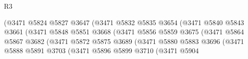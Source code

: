 \begin{lexlean}{R3}
\begin{coremodule}
                                              (@3471
                                                @5824
                                                @5827
                                                @3647
                                                (@3471
                                                  @5832
                                                  @5835
                                                  @3654
                                                  (@3471
                                                    @5840
                                                    @5843
                                                    @3661
                                                    (@3471
                                                      @5848
                                                      @5851
                                                      @3668
                                                      (@3471
                                                        @5856
                                                        @5859
                                                        @3675
                                                        (@3471
                                                          @5864
                                                          @5867
                                                          @3682
                                                          (@3471
                                                            @5872
                                                            @5875
                                                            @3689
                                                            (@3471
                                                              @5880
                                                              @5883
                                                              @3696
                                                              (@3471
                                                                @5888
                                                                @5891
                                                                @3703
                                                                (@3471
                                                                  @5896
                                                                  @5899
                                                                  @3710
                                                                  (@3471
                                                                    @5904

\end{coremodule}
\end{lexlean}
